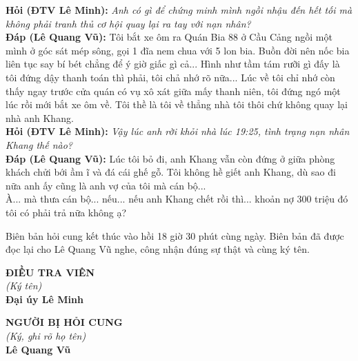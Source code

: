 \documentclass[12pt,a4paper]{article}
\begin{document}
\noindent\textbf{Hỏi (ĐTV Lê Minh):} \textit{Anh có gì để chứng minh mình ngồi nhậu đến hết tối mà không phải tranh thủ cơ hội quay lại ra tay với nạn nhân?}\\[0.15cm]
\noindent\textbf{Đáp (Lê Quang Vũ):} Tôi bắt xe ôm ra Quán Bia 88 ở Cầu Cảng ngồi một mình ở góc sát mép sông, gọi 1 đĩa nem chua với 5 lon bia. Buồn đời nên nốc bia liên tục say bí bét chẳng để ý giờ giấc gì cả... Hình như tầm tám rưỡi gì đấy là tôi đứng dậy thanh toán thì phải, tôi chả nhớ rõ nữa... Lúc về tôi chỉ nhớ còn thấy ngay trước cửa quán có vụ xô xát giữa mấy thanh niên, tôi đứng ngó một lúc rồi mới bắt xe ôm về. Tôi thề là tôi về thẳng nhà tôi thôi chứ không quay lại nhà anh Khang.\\[0.35cm]

\noindent\textbf{Hỏi (ĐTV Lê Minh):} \textit{Vậy lúc anh rời khỏi nhà lúc 19:25, tình trạng nạn nhân Khang thế nào?}\\[0.15cm]
\noindent\textbf{Đáp (Lê Quang Vũ):} Lúc tôi bỏ đi, anh Khang vẫn còn đứng ở giữa phòng khách chửi bới ầm ĩ và đá cái ghế gỗ. Tôi không hề giết anh Khang, dù sao đi nữa anh ấy cũng là anh vợ của tôi mà cán bộ...\\[0.35cm]

À... mà thưa cán bộ... nếu... nếu anh Khang chết rồi thì... khoản nợ 300 triệu đó tôi có phải trả nữa không ạ?



Biên bản hỏi cung kết thúc vào hồi 18 giờ 30 phút cùng ngày. Biên bản đã được đọc lại cho Lê Quang Vũ nghe, công nhận đúng sự thật và cùng ký tên.

\vspace{0.8cm}
\noindent
\begin{minipage}[t]{0.48\textwidth}
    \begin{center}
        \textbf{ĐIỀU TRA VIÊN}\\[0.1cm]
        \textit{(Ký tên)}\\[1.6cm]
        \textbf{Đại úy Lê Minh}
    \end{center}
\end{minipage}
\hfill
\begin{minipage}[t]{0.48\textwidth}
    \begin{center}
        \textbf{NGƯỜI BỊ HỎI CUNG}\\[0.1cm]
        \textit{(Ký, ghi rõ họ tên)}\\[1.6cm]
        \textbf{Lê Quang Vũ}
    \end{center}
\end{minipage}
\end{document}
